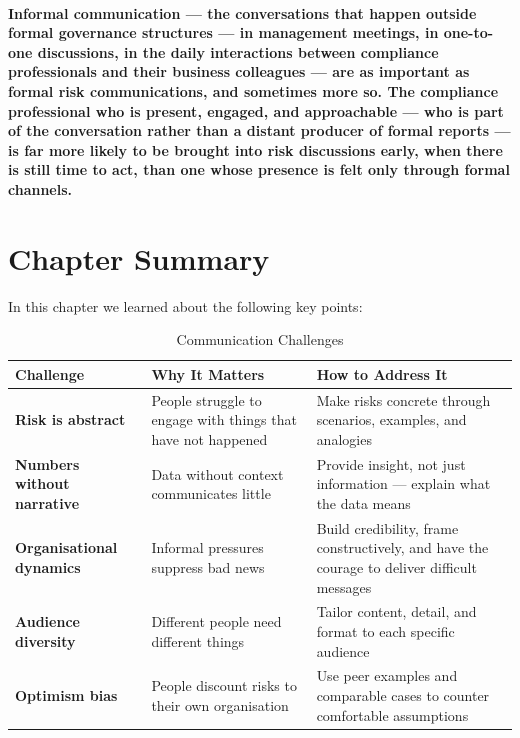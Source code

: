 \paragraph{\textbf{Informal communication} — the conversations that happen outside formal governance structures — in management meetings, in one-to-one discussions, in the daily interactions between compliance professionals and their business colleagues — are as important as formal risk communications, and sometimes more so. The compliance professional who is present, engaged, and approachable — who is part of the conversation rather than a distant producer of formal reports — is far more likely to be brought into risk discussions early, when there is still time to act, than one whose presence is felt only through formal channels.}

\newpage
\section{Chapter Summary}
In this chapter we learned about the following key points:
\begin{table}[H]
  \centering
  \renewcommand{\arraystretch}{1.5}
  \begin{tabularx}{\textwidth}{ | >{\raggedright\arraybackslash}p{} 
								| >{\raggedright\arraybackslash}p{} 
                                | >{\raggedright\arraybackslash}X | }
    \hline
    \textbf{Challenge} & \textbf{Why It Matters} & \textbf{How to Address It} \\
    \hline
    \textbf{Risk is abstract} & People struggle to engage with things that have not happened & Make risks concrete through scenarios, examples, and analogies\\
    \hline
    \textbf{Numbers without narrative} & Data without context communicates little & Provide insight, not just information — explain what the data means\\
    \hline
    \textbf{Organisational dynamics} & Informal pressures suppress bad news & Build credibility, frame constructively, and have the courage to deliver difficult messages\\
    \hline
    \textbf{Audience diversity} & Different people need different things & Tailor content, detail, and format to each specific audience\\
    \hline
    \textbf{Optimism bias} & People discount risks to their own organisation & Use peer examples and comparable cases to counter comfortable assumptions\\
    \hline
  \end{tabularx}
  \caption{Communication Challenges}
\end{table}

